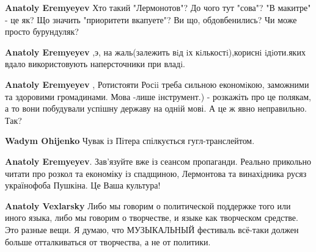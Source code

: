 \begin{itemize}
\begin{itemize}
\begin{itemize}
\textbf{Anatoly Eremyeyev} Хто такий "Лермонотов"? До чого тут "сова"? "В макитре" - це як? Що значить "приоритети вкапуете"? Ви що, обдовбенились? Чи може просто бурундуляк?

 
\textbf{Anatoly Eremyeyev} ,э, на жаль(залежить вiд iх кiлькостi),кориснi iдiоти.яких вдало використовують наперсточники при владi.

 
\textbf{Anatoly Eremyeyev} , Ротистояти Росii треба сильною економiкою,
заможними та здоровими громадинами. Мова -лише iнструмент.) - розкажіть про це
полякам, а то вони побудували успішну державу на одній мові. А це ж явно
неправильно. Так?

 
\textbf{Wadym Ohijenko} Чувак із Пітера спілкується гугл-транслейтом.

 
\textbf{Anatoly Eremyeyev}. Зав'язуйте вже із сеансом пропаганди. Реально прикольно читати про розкол та економіку із спадщиною, Лермонтова та винахідника русяз українофоба Пушкіна. Це Ваша культура!

 
\textbf{Anatoly Vexlarsky} Либо мы говорим о политической поддержке того или иного языка, либо мы говорим о творчестве, и языке как творческом средстве. Это разные вещи. Я думаю, что МУЗЫКАЛЬНЫЙ фестиваль всё-таки должен больше отталкиваться от творчества, а не от политики.


\end{itemize}
\end{itemize}
\end{itemize}
